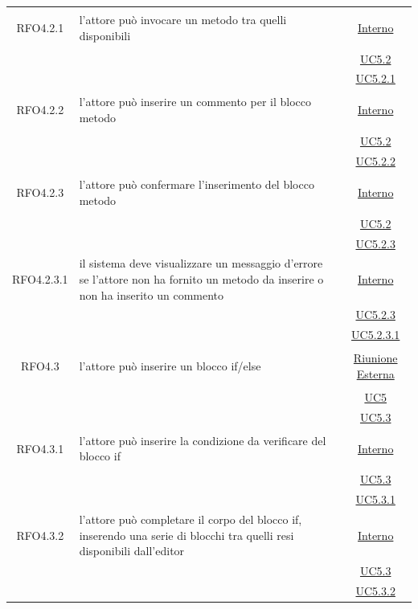 \begin{itemize}
\begin{itemize}
\begin{itemize}
\begin{itemize}
\begin{longtable}{|c|>{\centering}m{7cm}|c|}
\hypertarget{RFO4.2.1}{RFO4.2.1} & l'attore può invocare un metodo tra quelli disponibili & \hyperlink{Interno}{Interno}\\
& &\hyperref[UC5.2]{UC5.2}\\
& &\hyperref[UC5.2.1]{UC5.2.1}\\ \hline

\hypertarget{RFO4.2.2}{RFO4.2.2} & l'attore può inserire un commento per il blocco metodo & \hyperlink{Interno}{Interno}\\
& &\hyperref[UC5.2]{UC5.2}\\
& &\hyperref[UC5.2.2]{UC5.2.2}\\ \hline

\hypertarget{RFO4.2.3}{RFO4.2.3} & l'attore può confermare l'inserimento del blocco metodo & \hyperlink{Interno}{Interno}\\
& &\hyperref[UC5.2]{UC5.2}\\
& &\hyperref[UC5.2.3]{UC5.2.3}\\ \hline

\hypertarget{RFO4.2.3.1}{RFO4.2.3.1} & il sistema deve visualizzare un messaggio d'errore se l'attore non ha fornito un metodo da inserire o non ha inserito un commento & \hyperlink{Interno}{Interno}\\
& &\hyperref[UC5.2.3]{UC5.2.3}\\
& &\hyperref[UC5.2.3.1]{UC5.2.3.1}\\ \hline

\hypertarget{RFO4.3}{RFO4.3} & l'attore può inserire un blocco if/else & \hyperlink{Riunione Esterna}{Riunione Esterna}\\
& &\hyperref[UC5]{UC5}\\
& &\hyperref[UC5.3]{UC5.3}\\ \hline

\hypertarget{RFO4.3.1}{RFO4.3.1} & l'attore può inserire la condizione da verificare del blocco if & \hyperlink{Interno}{Interno}\\
& &\hyperref[UC5.3]{UC5.3}\\
& &\hyperref[UC5.3.1]{UC5.3.1}\\ \hline

\hypertarget{RFO4.3.2}{RFO4.3.2} & l'attore può completare il corpo del blocco if, inserendo una serie di blocchi tra quelli resi disponibili dall'editor  & \hyperlink{Interno}{Interno}\\
& &\hyperref[UC5.3]{UC5.3}\\
& &\hyperref[UC5.3.2]{UC5.3.2}\\ \hline


\end{longtable}
\end{itemize}
\end{itemize}
\end{itemize}
\end{itemize}
